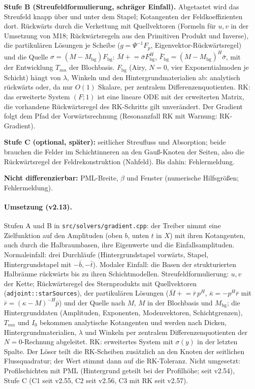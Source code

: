 \textbf{Stufe B (Streufeldformulierung, schräger Einfall).} Abgetastet wird das Streufeld knapp über und unter dem
Stapel; Kotangenten der Feldkoeffizienten dort. Rückwärts durch die Verkettung mit Quellvektoren (Formeln für $u,v$ in
der Umsetzung von M18; Rückwärtsregeln aus den Primitiven Produkt und Inverse), die partikulären Lösungen je Scheibe
($g=\Psi^{-1}F_p$, Eigenvektor-Rückwärtsregel) und die Quelle $\sigma=(M-M_{\text{bg}})F_{\text{bg}}$:
$\bar M\mathrel{+}=\bar\sigma F_{\text{bg}}^H$, $\bar F_{\text{bg}}=(M-M_{\text{bg}})^H\bar\sigma$, mit der
Entwicklung $T_{mn}$ der Blochbasis. $F_{\text{bg}}$ (Airy, $N=0$, vier Exponentialmoden je Schicht) hängt von
$\lambda$, Winkeln und den Hintergrundmaterialien ab: analytisch rückwärts oder, da nur $O(1)$ Skalare, per zentralem
Differenzenquotienten. RK: das erweiterte System $(F;1)$ ist eine lineare ODE mit der erweiterten Matrix, die
vorhandene Rückwärtsregel des RK-Schritts gilt unverändert. Der Gradient folgt dem Pfad der Vorwärtsrechnung
(Resonanzfall RK mit Warnung: RK-Gradient).

\textbf{Stufe C (optional, später):} seitlicher Streufluss und Absorption; beide brauchen die Felder im Schichtinneren an
den Gauß-Knoten der Seiten, also die Rückwärtsregel der Feldrekonstruktion (Nahfeld). Bis dahin: Fehlermeldung.

\textbf{Nicht differenzierbar:} PML-Breite, $\beta$ und Fenster (numerische Hilfsgrößen; Fehlermeldung).

\paragraph{Umsetzung (v2.13).} Stufen A und B in \verb|src/solvers/gradient.cpp|: der Treiber nimmt eine Zielfunktion
auf den Amplituden (oben $b$, unten $t$ in $X$) mit ihren Kotangenten, auch durch die Halbraumbasen, ihre Eigenwerte
und die Einfallsamplituden. Normaleinfall: drei Durchläufe (Hintergrundstapel vorwärts, Stapel, Hintergrundstapel mit
$-\bar b,-\bar t$). Modaler Einfall: die Basen der strukturierten Halbräume rückwärts bis zu ihren Schichtmodellen.
Streufeldformulierung: $u,v$ der Kette; Rückwärtsregel des Sternprodukts mit Quellvektoren
(\verb|adjoint::starSources|), der partikulären Lösungen ($\bar M\mathrel{+}=\bar r\,p^H$, $\bar\kappa=-p^H\bar r$
mit $\bar r=(\kappa-M)^{-H}\bar p$) und der Quelle nach $M$, $M$ in der Blochbasis und $M_{\text{bg}}$; die
Hintergrunddaten (Amplituden, Exponenten, Modenvektoren, Schichtgrenzen), $T_{mn}$ und $I_0$ bekommen analytische
Kotangenten und werden nach Dicken, Hintergrundmaterialien, $\lambda$ und Winkeln per zentralem Differenzenquotienten
der $N=0$-Rechnung abgeleitet. RK: erweitertes System mit $\sigma(y)$ in der letzten Spalte. Der Löser teilt die
RK-Scheiben zusätzlich an den Knoten der seitlichen Flussquadratur; der Wert stimmt dann auf die RK-Toleranz. Nicht
umgesetzt: Profilschichten mit PML (Hintergrund geteilt bei der Profilhöhe; seit v2.54), Stufe C (C1 seit v2.55, C2 seit v2.56, C3 mit RK seit v2.57).

